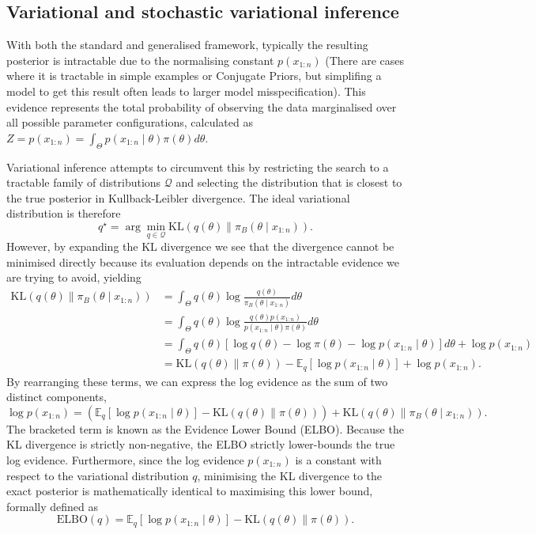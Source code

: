 \documentclass[mstat,12pt]{unswthesis}
\begin{document}
\vspace{1.5em}
\subsection*{Variational and stochastic variational inference}
With both the standard and generalised framework, typically the resulting posterior is intractable due to the normalising constant $p(x_{1:n})$ (There are cases where it is tractable in simple examples or Conjugate Priors, but simplifing a model to get this result often leads to larger model misspecification). This evidence represents the total probability of observing the data marginalised over all possible parameter configurations, calculated as $Z = p(x_{1:n}) = \int_{\Theta} p(x_{1:n} \mid \theta)\pi(\theta)d\theta$.

Variational inference attempts to circumvent this by restricting the search to a tractable family of distributions $\mathcal{Q}$ and selecting the distribution that is closest to the true posterior in Kullback-Leibler divergence. The ideal variational distribution is therefore$$q^\star = \arg\min_{q \in \mathcal{Q}} \mathrm{KL}(q(\theta) \| \pi_B(\theta \mid x_{1:n})).$$
However, by expanding the KL divergence we see that the divergence cannot be minimised directly because its evaluation depends on the intractable evidence we are trying to avoid, yielding$$\begin{aligned} \mathrm{KL}(q(\theta) \| \pi_B(\theta \mid x_{1:n})) &= \int_{\Theta} q(\theta) \log \frac{q(\theta)}{\pi_B(\theta \mid x_{1:n})} d\theta \\ &= \int_{\Theta} q(\theta) \log \frac{q(\theta) p(x_{1:n})}{p(x_{1:n} \mid \theta)\pi(\theta)} d\theta \\ &= \int_{\Theta} q(\theta) \left[ \log q(\theta) - \log \pi(\theta) - \log p(x_{1:n} \mid \theta) \right] d\theta + \log p(x_{1:n}) \\ &= \mathrm{KL}(q(\theta) \| \pi(\theta)) - \mathbb{E}_q[\log p(x_{1:n} \mid \theta)] + \log p(x_{1:n}). \end{aligned}$$By rearranging these terms, we can express the log evidence as the sum of two distinct components,$$\log p(x_{1:n}) = \left( \mathbb{E}_q[\log p(x_{1:n} \mid \theta)] - \mathrm{KL}(q(\theta) \| \pi(\theta)) \right) + \mathrm{KL}(q(\theta) \| \pi_B(\theta \mid x_{1:n})).$$The bracketed term is known as the Evidence Lower Bound (ELBO). Because the KL divergence is strictly non-negative, the ELBO strictly lower-bounds the true log evidence. Furthermore, since the log evidence $p(x_{1:n})$ is a constant with respect to the variational distribution $q$, minimising the KL divergence to the exact posterior is mathematically identical to maximising this lower bound, formally defined as$$\mathrm{ELBO}(q) = \mathbb{E}_q[\log p(x_{1:n} \mid \theta)] - \mathrm{KL}(q(\theta) \| \pi(\theta)).$$
\end{document}

